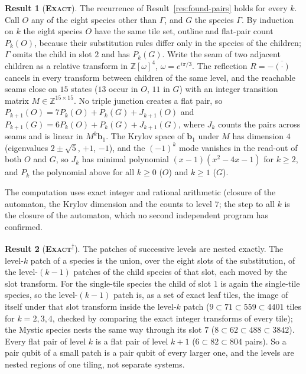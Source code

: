 \documentclass[11pt]{article}
\newcommand{\exact}{\textbf{\textsc{Exact}}}
\newcommand{\snap}{\textsuperscript{$\dagger$}}      %
\theoremstyle{definition}
\newtheorem{result}{Result}
\begin{document}
\begin{result}[\exact]\label{res:found-pairs-proof}
The recurrence of Result~\ref{res:found-pairs} holds for every $k$. Call $O$ any of the eight species other than $\Gamma$, and $G$ the species $\Gamma$. By induction on $k$ the eight species $O$ have the same tile set, outline and flat-pair count $P_k(O)$, because their substitution rules differ only in the species of the children; $\Gamma$ omits the child in slot $2$ and has $P_k(G)$. Write the seam of two adjacent children as a relative transform in $\mathbb{Z}[\omega]^4$, $\omega=e^{i\pi/3}$. The reflection $R=-\overline{(\cdot)}$ cancels in every transform between children of the same level, and the reachable seams close on $15$ states ($13$ occur in $O$, $11$ in $G$) with an integer transition matrix $M\in\mathbb{Z}^{15\times15}$. No triple junction creates a flat pair, so $P_{k+1}(O)=7P_k(O)+P_k(G)+J_{k+1}(O)$ and $P_{k+1}(G)=6P_k(O)+P_k(G)+J_{k+1}(G)$, where $J_k$ counts the pairs across seams and is linear in $M^k\mathbf b_1$. The Krylov space of $\mathbf b_1$ under $M$ has dimension $4$ (eigenvalues $2\pm\sqrt5$, $+1$, $-1$), and the $(-1)^k$ mode vanishes in the read-out of both $O$ and $G$, so $J_k$ has minimal polynomial $(x-1)(x^2-4x-1)$ for $k\ge2$, and $P_k$ the polynomial above for all $k\ge0$ ($O$) and $k\ge1$ ($G$).
\end{result}
The computation uses exact integer and rational arithmetic (closure of the automaton, the Krylov dimension and the counts to level $7$; the step to all $k$ is the closure of the automaton, which no second independent program has confirmed.
\begin{result}[\exact\snap]\label{res:nesting}
The patches of successive levels are nested exactly. The level-$k$ patch of a species is the union, over the eight slots of the substitution, of the level-$(k{-}1)$ patches of the child species of that slot, each moved by the slot transform. For the single-tile species the child of slot $1$ is again the single-tile species, so the level-$(k{-}1)$ patch is, as a set of exact leaf tiles, the image of itself under that slot transform inside the level-$k$ patch ($9\subset71\subset559\subset4401$ tiles for $k=2,3,4$, checked by comparing the exact integer transforms of every tile); the Mystic species nests the same way through its slot $7$ ($8\subset62\subset488\subset3842$). Every flat pair of level $k$ is a flat pair of level $k+1$ ($6\subset82\subset804$ pairs). So a pair qubit of a small patch is a pair qubit of every larger one, and the levels are nested regions of one tiling, not separate systems.
\end{result}
\end{document}
